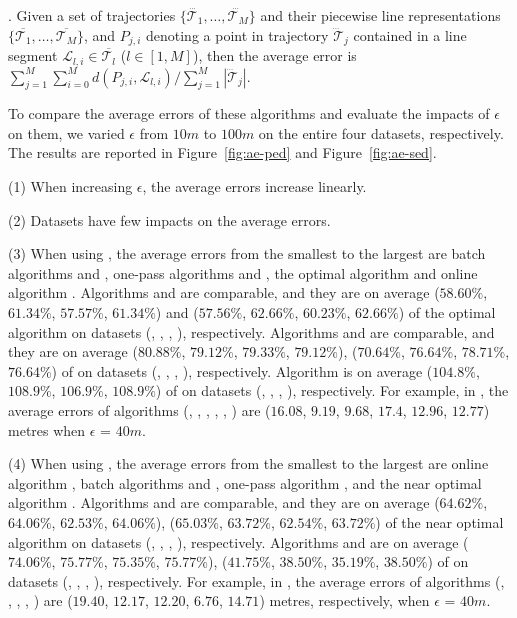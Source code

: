 .
Given a set of trajectories $\{\dddot{\mathcal{T}_1}, \ldots, \dddot{\mathcal{T}_M}\}$ and their piecewise line representations
$\{\overline{\mathcal{T}_1}, \ldots, \overline{\mathcal{T}_M}\}$, and $P_{j,i}$ denoting
a point in trajectory $\dddot{\mathcal{T}}_j$ contained in a line segment $\mathcal{L}_{l,i}\in\overline{\mathcal{T}_l}$ ($l\in[1,M]$),
then the average error is $\sum_{j=1}^{M}\sum_{i=0}^{M} d(P_{j,i},
\mathcal{L}_{l,i})/\sum_{j=1}^{M}{|\dddot{\mathcal{T}}_j |}$.

To compare the average errors of these algorithms and evaluate the impacts of $\epsilon$ on them, we varied $\epsilon$ from $10m$ to $100m$ on the entire four datasets, respectively.
The results are reported in Figure~\ref{fig:ae-ped} and Figure~\ref{fig:ae-sed}.


\sstab (1) When increasing $\epsilon$, the average errors increase linearly. 

\sstab (2) Datasets have few impacts on the average errors.

\sstab (3) When using \ped, the average errors from the smallest
to the largest are batch algorithms \tpa and \dpa, one-pass
algorithms \siped and \operb, the optimal algorithm \optp and online algorithm \bqsa. 
Algorithms \tpa and
\dpa are comparable, and they are on average ($58.60\%$, $61.34\%$,
$57.57\%$, $61.34\%$) and ($57.56\%$, $62.66\%$, $60.23\%$, $62.66\%$) of the optimal algorithm \optp on datasets (\ucar, \geolife, \mopsi, \act), respectively.
Algorithms \siped and \operb are comparable, and they are on average
($80.88\%$, $79.12\%$, $79.33\%$, $79.12\%$), ($70.64\%$, $76.64\%$, $78.71\%$,
$76.64\%$) of \optp on datasets (\ucar, \geolife, \mopsi, \act), respectively.
Algorithm \bqsa is on average ($104.8\%$, $108.9\%$, $106.9\%$, $108.9\%$) of \optp on datasets (\ucar, \geolife, \mopsi, \act), respectively.
%
For example, in \mopsi, the average errors of algorithms
(\optp, \tpa, \dpa, \bqsa, \siped, \operb ) are ($16.08$, $9.19$, $9.68$, $17.4$, $12.96$, $12.77$)  metres when $\epsilon$ = $40m$.

\sstab (4) When using \sed, the average errors from the smallest
to the largest are online algorithm \squishe, batch algorithms \tpa and \dpa,
one-pass algorithm \cised, and the near optimal algorithm \nopts.
Algorithms \tpa and \dpa are comparable, and they are on average
($64.62\%$, $64.06\%$, $62.53\%$, $64.06\%$), ($65.03\%$, $63.72\%$, $62.54\%$,
$63.72\%$) of the near optimal algorithm \nopts on datasets (\ucar, \geolife,
\mopsi, \act), respectively.
Algorithms \cised and \squishe are on average ($74.06\%$, $75.77\%$, $75.35\%$,
$75.77\%$), ($41.75\%$, $38.50\%$, $35.19\%$, $38.50\%$) of \nopts on datasets (\ucar, \geolife, \mopsi, \act), respectively.
%
For example, in \mopsi, the average errors of algorithms
(\nopts, \tpa, \dpa, \squishe, \cised) are ($19.40$, $12.17$, $12.20$, $6.76$, $14.71$) metres, respectively, when $\epsilon$ = $40m$.

